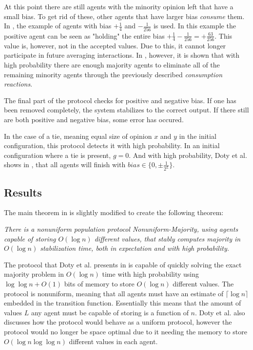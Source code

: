 At this point there are still agents with the minority opinion left that have a small bias. To get rid of these, other agents that have larger bias \emph{consume} them. In \cite{dotyTimeSpaceOptimal2022}, the example of agents with bias $+ \frac{1}{4}$ and $- \frac{1}{256}$ is used. In this example the positive agent can be seen as "holding" the entire bias $+ \frac{1}{4} - \frac{1}{256} = + \frac{63}{256}$. This value is, however, not in the accepted values. Due to this, it cannot longer participate in future averaging interactions. In \cite{dotyTimeSpaceOptimal2022}, however, it is shown that with high probability there are enough majority agents to eliminate all of the remaining minority agents through the previously described \emph{consumption reactions}.

The final part of the protocol checks for positive and negative bias. If one has been removed completely, the system stabilizes to the correct output. If there still are both positive and negative bias, some error has occured.

In the case of a tie, meaning equal size of opinion $x$ and $y$ in the initial configuration, this protocol detects it with high probability. In an initial configuration where a tie is present, $g = 0$. And with high probability, Doty et al. shows in \cite{dotyTimeSpaceOptimal2022}, that all agents will finish with $bias \in \{ 0, \pm \frac{1}{2^L} \}$. 


\subsection{Results} \label{Section4Results}

The main theorem in \cite{dotyTimeSpaceOptimal2022} is slightly modified to create the following theorem: 

 \begin{theorem}
    \textit{
        There is a nonuniform population protocol Nonuniform-Majority, using agents capable of storing $O(\log n)$ different values, that stably computes majority in $O(\log n)$ stabilization time, both in expectation and with high probability.
    }
 \end{theorem} 

The protocol that Doty et al. presents in \cite{dotyTimeSpaceOptimal2022} is capable of quickly solving the exact majority problem in $O(\log n)$ time with high probability using $\log \log n + O(1)$ bits of memory to store $O(\log n)$ different values. The protocol is nonuniform, meaning that all agents must have an estimate of $\lceil \log n \rceil$ embedded in the transition function. Essentially this means that the amount of values $L$ any agent must be capable of storing is a function of $n$. Doty et al. also discusses how the protocol would behave as a uniform protocol, however the protocol would no longer be space optimal due to it needing the memory to store $O(\log n \log \log n)$ different values in each agent. 

